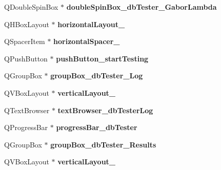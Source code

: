 \begin{DoxyCompactItemize}
\item 
\mbox{\label{class_ui___main_window_a34b49c9dd9daef9f749fdc7c9df51946}} 
Q\+Double\+Spin\+Box $\ast$ {\bfseries double\+Spin\+Box\+\_\+db\+Tester\+\_\+\+Gabor\+Lambda}
\item 
\mbox{\label{class_ui___main_window_a1e64a8da62994a2cb0ff65f32b26639e}} 
Q\+H\+Box\+Layout $\ast$ {\bfseries horizontal\+Layout\+\_}
\item 
\mbox{\label{class_ui___main_window_ab6496ca8cbff418ced70438d3c6f8b1b}} 
Q\+Spacer\+Item $\ast$ {\bfseries horizontal\+Spacer\+\_}
\item 
\mbox{\label{class_ui___main_window_aacdfd753989c480d17a35ccc5df3b251}} 
Q\+Push\+Button $\ast$ {\bfseries push\+Button\+\_\+start\+Testing}
\item 
\mbox{\label{class_ui___main_window_a579598a82f4c87073b6a73d1907bbeee}} 
Q\+Group\+Box $\ast$ {\bfseries group\+Box\+\_\+db\+Tester\+\_\+\+Log}
\item 
\mbox{\label{class_ui___main_window_ae0fcc85c6af290d1ba9d090c6856b217}} 
Q\+V\+Box\+Layout $\ast$ {\bfseries vertical\+Layout\+\_}
\item 
\mbox{\label{class_ui___main_window_ae266b2a5e73f6cd5a78853e34375cf86}} 
Q\+Text\+Browser $\ast$ {\bfseries text\+Browser\+\_\+db\+Tester\+Log}
\item 
\mbox{\label{class_ui___main_window_a30937038f522dd44452089881b649375}} 
Q\+Progress\+Bar $\ast$ {\bfseries progress\+Bar\+\_\+db\+Tester}
\item 
\mbox{\label{class_ui___main_window_a4a52cb15dff3d961e5cb1ffb587cbd58}} 
Q\+Group\+Box $\ast$ {\bfseries group\+Box\+\_\+db\+Tester\+\_\+\+Results}
\item 
\mbox{\label{class_ui___main_window_a44a96bf6c50e331e1881f83744e5ccde}} 
Q\+V\+Box\+Layout $\ast$ {\bfseries vertical\+Layout\+\_}
\item 

\end{DoxyCompactItemize}
